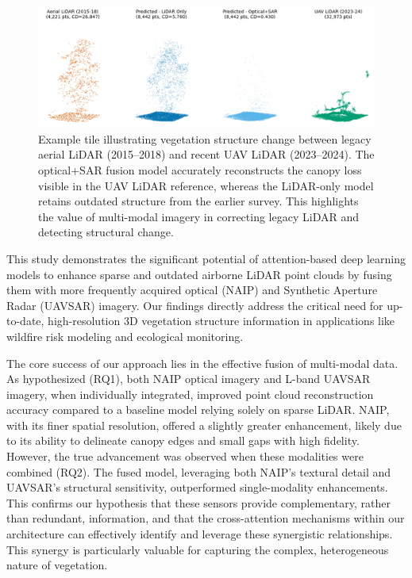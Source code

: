 \documentclass[preprints,article,accept,pdftex,moreauthors]{Definitions/mdpi}
\begin{document}
\begin{figure}
    \centering
    \includegraphics[width=1\linewidth]{manuscript/figures/canopy_loss_prediction.png}
    \caption{Example tile illustrating vegetation structure change between legacy aerial LiDAR (2015--2018) and recent UAV LiDAR (2023--2024). The optical+SAR fusion model accurately reconstructs the canopy loss visible in the UAV LiDAR reference, whereas the LiDAR-only model retains outdated structure from the earlier survey. This highlights the value of multi-modal imagery in correcting legacy LiDAR and detecting structural change.}
    \label{fig:enter-label}
\end{figure}

This study demonstrates the significant potential of attention-based deep learning models to enhance sparse and outdated airborne LiDAR point clouds by fusing them with more frequently acquired optical (NAIP) and Synthetic Aperture Radar (UAVSAR) imagery. Our findings directly address the critical need for up-to-date, high-resolution 3D vegetation structure information in applications like wildfire risk modeling and ecological monitoring.

The core success of our approach lies in the effective fusion of multi-modal data. As hypothesized (RQ1), both NAIP optical imagery and L-band UAVSAR imagery, when individually integrated, improved point cloud reconstruction accuracy compared to a baseline model relying solely on sparse LiDAR. NAIP, with its finer spatial resolution, offered a slightly greater enhancement, likely due to its ability to delineate canopy edges and small gaps with high fidelity. However, the true advancement was observed when these modalities were combined (RQ2). The fused model, leveraging both NAIP's textural detail and UAVSAR's structural sensitivity, outperformed single-modality enhancements. This confirms our hypothesis that these sensors provide complementary, rather than redundant, information, and that the cross-attention mechanisms within our architecture can effectively identify and leverage these synergistic relationships. This synergy is particularly valuable for capturing the complex, heterogeneous nature of vegetation.
\end{document}
